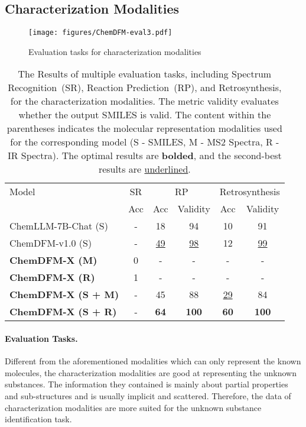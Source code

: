 \subsection{Characterization Modalities}

\begin{figure}
    \centering
    \texttt{[image: figures/ChemDFM-eval3.pdf]}
    \caption{Evaluation tasks for characterization modalities}
    \label{figure:eval3}
\end{figure}

\begin{table*}[t]
    \centering
    \begin{tabular}{lccccc}
    \toprule
    \multirow{2.1}{*}{Model} & SR & \multicolumn{2}{c}{RP} & \multicolumn{2}{c}{Retrosynthesis} \\
    \cmidrule(rl){2-2} \cmidrule(rl){3-4} \cmidrule(rl){5-6}
    & \small{Acc} & \small{Acc} & \small{Validity} & \small{Acc} & \small{Validity} \\
    \midrule
    ChemLLM-7B-Chat (S)~\cite{zhang2024chemllm} & - & 18 & 94 & 10 & 91 \\
    ChemDFM-v1.0 (S)~\cite{zhao2024chemdfm} & - & \underline{49} & \underline{98} & 12 & \underline{99} \\
    \multirow{1}{*}{\textbf{ChemDFM-X (M)}} & 0 & - & - & - & - \\
    \multirow{1}{*}{\textbf{ChemDFM-X (R)}} & 1 & - & - & - & - \\
    \multirow{1}{*}{\textbf{ChemDFM-X (S + M)}} & - & 45 & 88 & \underline{29} & 84 \\
    \multirow{1}{*}{\textbf{ChemDFM-X (S + R)}} & - & \textbf{64} & \textbf{100} & \textbf{60} & \textbf{100} \\
    \bottomrule
    \end{tabular}
    \caption{The Results of multiple evaluation tasks, including Spectrum Recognition~(SR), Reaction Prediction~(RP), and Retrosynthesis, for the characterization modalities. The metric validity evaluates whether the output SMILES is valid. The content within the parentheses indicates the molecular representation modalities used for the corresponding model (S - SMILES, M - MS2 Spectra, R - IR Spectra). The optimal results are \textbf{bolded}, and the second-best results are \underline{underlined}.}
    \label{tab:spect-other}
\end{table*}

\paragraph{Evaluation Tasks.} Different from the aforementioned modalities which can only represent the known molecules, the characterization modalities are good at representing the unknown substances. The information they contained is mainly about partial properties and sub-structures and is usually implicit and scattered. Therefore, the data of characterization modalities are more suited for the unknown substance identification task.

